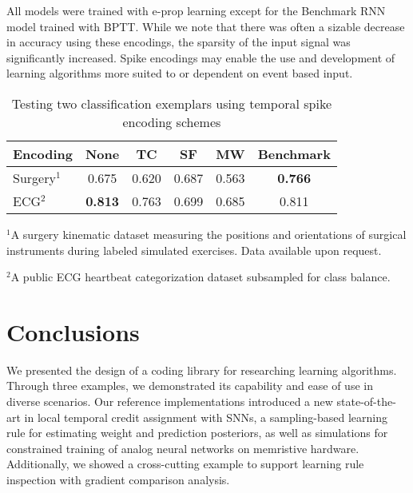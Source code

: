 \documentclass[sigconf,dvipsnames]{acmart}
\begin{document}
All models were trained with e-prop learning except for the Benchmark RNN model trained with BPTT.
While we note that there was often a sizable decrease in accuracy using these encodings, the sparsity of the input signal was significantly increased.
Spike encodings may enable the use and development of learning algorithms more suited to or dependent on event based input.

\begin{table}
\setlength{\tabcolsep}{7pt}
\centering
\caption{Testing two classification exemplars using temporal spike encoding schemes}
\label{tab:surg-ecg_table}
\begin{tabular}{lccccc}
\toprule
Encoding & None            & TC & SF & MW & Benchmark       \\
\midrule
Surgery$^{1}$  & 0.675           & 0.620   & 0.687   & 0.563   & \textbf{0.766} \\
ECG$^{2}$      & \textbf{0.813}  & 0.763   & 0.699   & 0.685   & 0.811    \\
\bottomrule
\end{tabular}
\begin{flushleft}
$^{1}$A surgery kinematic dataset measuring the positions and orientations of surgical instruments during labeled simulated exercises. Data available upon request.

$^{2}$A public ECG heartbeat categorization dataset \cite{kachuee2018ecg} subsampled for class balance.
\end{flushleft}
\end{table}

\section{Conclusions}
We presented the design of a coding library for researching learning algorithms.
Through three examples, we demonstrated its capability and ease of use in diverse scenarios.
Our reference implementations introduced a new state-of-the-art in local temporal credit assignment with SNNs, a sampling-based learning rule for estimating weight and prediction posteriors, as well as simulations for constrained training of analog neural networks on memristive hardware.
Additionally, we showed a cross-cutting example to support learning rule inspection with gradient comparison analysis.
\end{document}

